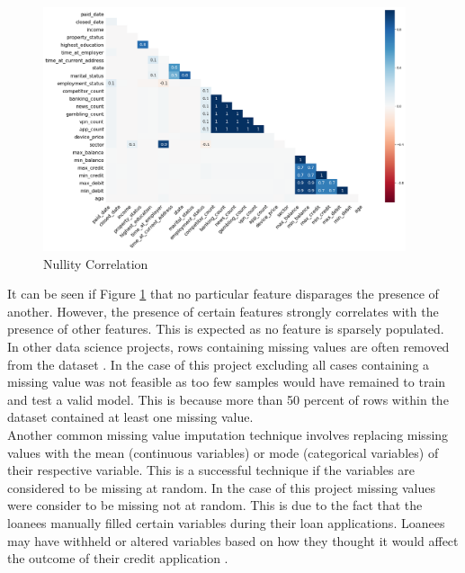 \vspace{10pt}

\begin{figure}[!htb]
\centering
\includegraphics[width=0.95\textwidth]{images/nutility_correlation.png}
\caption{Nullity Correlation}
\label{fig:nullity}
\end{figure}

\vspace{10pt}

It can be seen if Figure \ref{fig:nullity} that no particular feature disparages the presence of another. However, the presence of certain features strongly correlates with the presence of other features. This is expected as no feature is sparsely populated. \\

 In other data science projects, rows containing missing values are often removed from the dataset \parencite{MissingValues}.  In the case of this project excluding all cases containing a missing value was not feasible as too few samples would have remained to train and test a valid model. This is because more than 50 percent of rows within the dataset contained at least one missing value. \\

Another common missing value imputation technique involves replacing missing values with the mean (continuous variables) or mode (categorical variables) of their respective variable. This is a successful technique if the variables are considered to be missing at random. In the case of this project missing values were consider to be missing not at random. This is due to the fact that the loanees manually filled certain variables during their loan applications. Loanees may have withheld or altered variables based on how they thought it would affect the outcome of their credit application \parencite{MissingValuesBos}. \\

